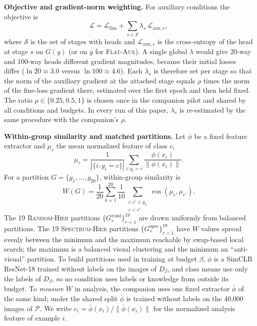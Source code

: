 \documentclass{article} %
\newcommand{\cn}[1]{\textsc{#1}}
\newcommand{\pool}{\mathcal{P}}
\begin{document}
\textbf{Objective and gradient-norm weighting.} For auxiliary conditions the objective is
\begin{equation}
\mathcal{L}=\mathcal{L}_{\mathrm{fine}}+\sum_{s\in\mathcal{S}}\lambda_s\,\mathcal{L}_{\mathrm{aux},s},
\label{eq:objective}
\end{equation}
where $\mathcal{S}$ is the set of stages with heads and $\mathcal{L}_{\mathrm{aux},s}$ is the cross-entropy of the head at stage $s$ on $G(y)$ (or on $y$ for \cn{Flat-Aux}). A single global $\lambda$ would give 20-way and 100-way heads different gradient magnitudes, because their initial losses differ ($\ln 20\approx 3.0$ versus $\ln 100\approx 4.6$). Each $\lambda_s$ is therefore set per stage so that the norm of the auxiliary gradient at the attached stage equals $\rho$ times the norm of the fine-loss gradient there, estimated over the first epoch and then held fixed. The ratio $\rho\in\{0.25,0.5,1\}$ is chosen once in the companion pilot and shared by all conditions and budgets. In every run of this paper, $\lambda_s$ is re-estimated by the same procedure with the companion's $\rho$.

\textbf{Within-group similarity and matched partitions.} Let $\phi$ be a fixed feature extractor and $\mu_c$ the mean normalized feature of class $c$,
\begin{equation}
\mu_c=\frac{1}{|\{i:y_i=c\}|}\sum_{i:y_i=c}\frac{\phi(x_i)}{\|\phi(x_i)\|}.
\label{eq:classmean}
\end{equation}
For a partition $G=\{g_1,\ldots,g_{20}\}$, within-group similarity is
\begin{equation}
W(G)=\frac{1}{20}\sum_{k=1}^{20}\frac{1}{10}\sum_{\substack{c,c'\in g_k\\ c<c'}}\cos(\mu_c,\mu_{c'}).
\label{eq:w}
\end{equation}
The 19 \cn{Random-Hier} partitions $\{G^{\mathrm{rand}}_r\}_{r=1}^{19}$ are drawn uniformly from balanced partitions. The 19 \cn{Spectrum-Hier} partitions $\{G^{\mathrm{spec}}_r\}_{r=1}^{19}$ have $W$ values spread evenly between the minimum and the maximum reachable by swap-based local search; the maximum is a balanced visual clustering and the minimum an ``anti-visual'' partition. To build partitions used in training at budget $\beta$, $\phi$ is a SimCLR ResNet-18 \citep{chen2020simclr} trained without labels on the images of $D_\beta$, and class means use only the labels of $D_\beta$, so no condition uses labels or knowledge from outside its budget. To \emph{measure} $W$ in analysis, the companion uses one fixed extractor $\bar\phi$ of the same kind; under the shared split $\bar\phi$ is trained without labels on the 40,000 images of $\pool$. We write $e_i=\bar\phi(x_i)/\|\bar\phi(x_i)\|$ for the normalized analysis feature of example $i$.
\end{document}
